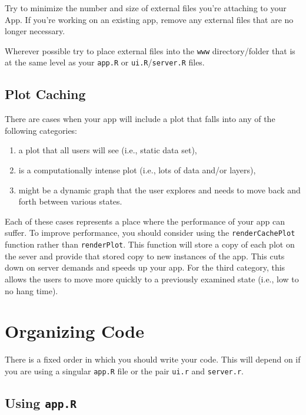\documentclass[]{book}
\providecommand{\tightlist}{%
  \setlength{\itemsep}{0pt}\setlength{\parskip}{0pt}}
\begin{document}
Try to minimize the number and size of external files you're attaching to your App. If you're working on an existing app, remove any external files that are no longer necessary.

Wherever possible try to place external files into the \texttt{www} directory/folder that is at the same level as your \texttt{app.R} or \texttt{ui.R}/\texttt{server.R} files.

\hypertarget{plotCache}{%
\subsection{Plot Caching}\label{plotCache}}

There are cases when your app will include a plot that falls into any of the following categories:

\begin{enumerate}
\def\labelenumi{\arabic{enumi})}
\tightlist
\item
  a plot that all users will see (i.e., static data set),
\item
  is a computationally intense plot (i.e., lots of data and/or layers),
\item
  might be a dynamic graph that the user explores and needs to move back and forth between various states.
\end{enumerate}

Each of these cases represents a place where the performance of your app can suffer. To improve performance, you should consider using the \texttt{renderCachePlot} function rather than \texttt{renderPlot}. This function will store a copy of each plot on the sever and provide that stored copy to new instances of the app. This cuts down on server demands and speeds up your app. For the third category, this allows the users to move more quickly to a previously examined state (i.e., low to no hang time).

\hypertarget{orgCode}{%
\section{Organizing Code}\label{orgCode}}

There is a fixed order in which you should write your code. This will depend on if you are using a singular \texttt{app.R} file or the pair \texttt{ui.r} and \texttt{server.r}.

\hypertarget{using-app.r}{%
\subsection{\texorpdfstring{Using \texttt{app.R}}{Using app.R}}\label{using-app.r}}
\end{document}
